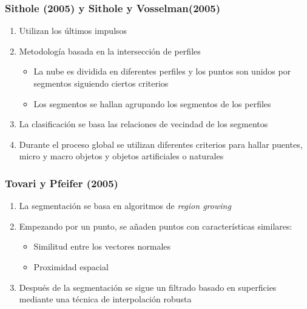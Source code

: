 \begin{frame}
  \frametitle{Sithole (2005) y Sithole y Vosselman(2005)}
  \begin{enumerate}
    \item Utilizan los últimos impulsos 
    \item Metodología basada en la intersección de perfiles
      \begin{itemize}
        \item La nube es dividida en diferentes perfiles y los puntos son unidos
          por segmentos siguiendo ciertos criterios
        \item Los segmentos se hallan agrupando los segmentos de los perfiles
      \end{itemize}
    \item La clasificación se basa las relaciones de vecindad de los segmentos
    \item Durante el proceso global se utilizan diferentes criterios para hallar
      puentes, micro y macro objetos y objetos artificiales o naturales
  \end{enumerate}
\end{frame}
\begin{frame}
  \frametitle{Tovari y Pfeifer (2005)}
  \begin{enumerate}
    \item La segmentación se basa en algoritmos de \alert{\emph{region growing}}
    \item Empezando por un punto, se añaden puntos con características
      similares:
      \begin{itemize}
        \item Similitud entre los vectores normales
        \item Proximidad espacial
      \end{itemize}
    \item Después de la segmentación se sigue un filtrado basado en superficies
      mediante una técnica de interpolación robusta
  \end{enumerate}
\end{frame}
